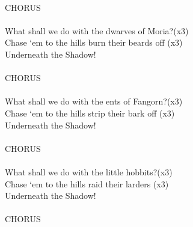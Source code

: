 \begin{multicols}{2}
\\
CHORUS
\\
\\
What shall we do with the dwarves of Moria?(x3)
\\
Chase ‘em to the hills burn their beards off (x3)
\\
Underneath the Shadow!
\\
\\
CHORUS
\\
\\
What shall we do with the ents of Fangorn?(x3)
\\
Chase ‘em to the hills strip their bark off (x3)
\\
Underneath the Shadow!
\\
\\
CHORUS
\\
\\
What shall we do with the little hobbits?(x3)
\\
Chase ‘em to the hills raid their larders (x3)
\\
Underneath the Shadow!
\\
\\
CHORUS
\\
\\
\\
\\
\end{multicols}